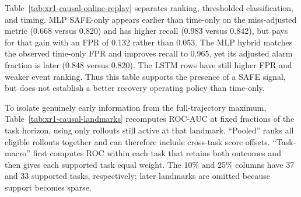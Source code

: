 \documentclass[11pt,a4paper]{article}
\begin{document}
\begin{table}[H]
\centering
\caption{Post-hoc causal online event replay on the fixed 76-rollout Xiaomi
outer test. Thresholds were selected independently on the 76-rollout
validation split, so FPR is not matched across rows. Lower detection fractions
are earlier; adjusted detection assigns missed failures 1.0.}
\label{tab:xr1-causal-online-replay}
\end{table}

Table~\ref{tab:xr1-causal-online-replay} separates ranking, thresholded
classification, and timing. MLP SAFE-only appears earlier than time-only on
the miss-adjusted metric (0.668 versus 0.820) and has higher recall (0.983
versus 0.842), but pays for that gain with an FPR of 0.132 rather than 0.053.
The MLP hybrid matches the observed time-only FPR and improves recall to 0.965,
yet its adjusted alarm fraction is later (0.848 versus 0.820). The LSTM rows
have still higher FPR and weaker event ranking. Thus this table supports the
presence of a SAFE signal, but does not establish a better recovery operating
policy than time-only.

To isolate genuinely early information from the full-trajectory maximum,
Table~\ref{tab:xr1-causal-landmarks} recomputes ROC-AUC at fixed fractions of
the task horizon, using only rollouts still active at that landmark. ``Pooled''
ranks all eligible rollouts together and can therefore include cross-task score
offsets. ``Task-macro'' first computes ROC within each task that retains both
outcomes and then gives each supported task equal weight. The 10\% and 25\%
columns have 37 and 33 supported tasks, respectively; later landmarks are
omitted because support becomes sparse.
\end{document}
